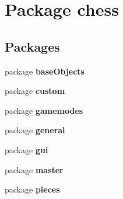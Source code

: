 \section{Package chess}
\label{namespacechess}
\subsection*{Packages}
\begin{DoxyCompactItemize}
\item 
package {\bf base\+Objects}
\item 
package {\bf custom}
\item 
package {\bf gamemodes}
\item 
package {\bf general}
\item 
package {\bf gui}
\item 
package {\bf master}
\item 
package {\bf pieces}
\end{DoxyCompactItemize}
